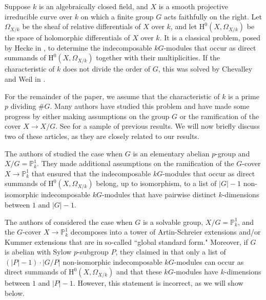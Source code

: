 \documentclass{amsart}
\numberwithin{equation}{section}
\numberwithin{table}{section}
\theoremstyle{plain}
\theoremstyle{definition}
\theoremstyle{remark}
\newcommand{\HH}{\mathrm{H}}
\begin{document}
Suppose $k$ is an algebraically closed field, and $X$ is a smooth projective irreducible curve over $k$ on which a finite group $G$ acts faithfully on the right. Let $\Omega_{X/k}$ be the sheaf of relative differentials of $X$ over $k$,
and let $\HH^0(X,\Omega_{X/k})$ be the space of holomorphic differentials of $X$ over $k$. 
It is a classical problem, posed by Hecke in \cite{Hecke1928}, to determine the indecomposable $kG$-modules that occur as direct summands of $\HH^0(X,\Omega_{X/k})$ together with their multiplicities. If the characteristic of $k$ does not divide the order of $G$, this was solved by Chevalley and Weil  in \cite{ChevalleyWeil1934}.

For the remainder of the paper, we assume that the characteristic of $k$ is a prime $p$ dividing $\#G$. Many authors have studied this problem and have made some progress by either making assumptions on the group $G$ or the ramification of the cover $X\to X/G$. See \cite{ValentiniMadan1981,Kani1986,Nakajima1986,RzedowskiCVillaSMadan1996,Kock2004,KaranikolopoulosKontogeorgis2013,MarquesWard2018,BleherChinburgKontogeorgis2020,Garnek2022} for a sample of previous results. We will now briefly discuss two of these articles, as they are closely related to our results.


The authors of \cite{RzedowskiCVillaSMadan1996} studied the case when $G$ is an elementary abelian $p$-group and $X/G=\mathbb{P}^1_k$. They made additional assumptions on the ramification of the $G$-cover $X \to \mathbb{P}^1_k$ that ensured that the indecomposable $kG$-modules that occur as direct summands of $\HH^0(X,\Omega_{X/k})$ belong, up to isomorphism, to a list of $|G| - 1$ non-isomorphic indecomposable $kG$-modules that have pairwise distinct $k$-dimensions between $1$ and $|G| - 1$. 

The authors of \cite{MarquesWard2018} considered the case when $G$ is a solvable group, $X/G=\mathbb{P}^1_k$, and the $G$-cover $X \to \mathbb{P}^1_k$ decomposes into a tower of Artin-Schreier extensions and/or Kummer extensions that are in so-called ``global standard form." Moreover, if $G$ is abelian with Sylow $p$-subgroup $P$, they claimed in \cite[Theorem 6.4]{MarquesWard2018} that only a list of $(|P| - 1)\cdot |G/P|$ non-isomorphic indecomposable $kG$-modules can occur as direct summands of $\HH^0(X,\Omega_{X/k})$ and that these $kG$-modules have $k$-dimensions between $1$ and $|P| - 1$. However, this statement is incorrect, 
as we will show below.
\end{document}
